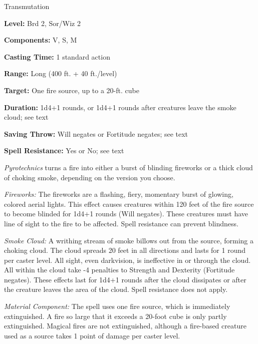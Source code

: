 
Transmutation

\textbf{Level:} Brd 2, Sor/Wiz 2

\textbf{Components:} V, S, M

\textbf{Casting Time:} 1 standard action

\textbf{Range:} Long (400 ft. + 40 ft./level)

\textbf{Target:} One fire source, up to a 20-ft. cube

\textbf{Duration:} 1d4+1 rounds, or 1d4+1 rounds after creatures leave the smoke 
cloud; see text

\textbf{Saving Throw:} Will negates or Fortitude negates; see text

\textbf{Spell Resistance:} Yes or No; see text

\textit{Pyrotechnics} turns a fire into either a burst of blinding fireworks or 
a thick cloud of choking smoke, depending on the version you choose.

\textit{Fireworks:} The fireworks are a flashing, fiery, momentary burst of glowing, 
colored aerial lights. This effect causes creatures within 120 feet of the fire 
source to become blinded for 1d4+1 rounds (Will negates). These creatures must 
have line of sight to the fire to be affected. Spell resistance can prevent blindness.

\textit{Smoke Cloud:} A writhing stream of smoke billows out from the source, forming 
a choking cloud. The cloud spreads 20 feet in all directions and lasts for 1 round 
per caster level. All sight, even darkvision, is ineffective in or through the 
cloud. All within the cloud take -4 penalties to Strength and Dexterity (Fortitude 
negates). These effects last for 1d4+1 rounds after the cloud dissipates or after 
the creature leaves the area of the cloud. Spell resistance does not apply.

\textit{Material Component:} The spell uses one fire source, which is immediately 
extinguished. A fire so large that it exceeds a 20-foot cube is only partly extinguished. 
Magical fires are not extinguished, although a fire-based creature used as a source 
takes 1 point of damage per caster level.

